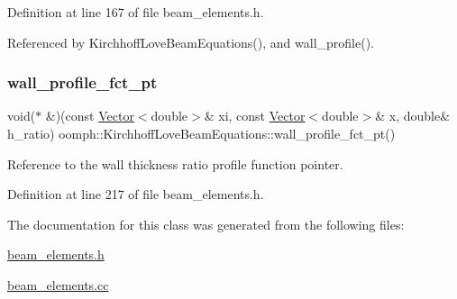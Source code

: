 Definition at line 167 of file beam\+\_\+elements.\+h.



Referenced by Kirchhoff\+Love\+Beam\+Equations(), and wall\+\_\+profile().

\mbox{\label{classoomph_1_1KirchhoffLoveBeamEquations_a692f4e893d75223ca5bedbb4ab5a1572}} 
\subsubsection{\texorpdfstring{wall\+\_\+profile\+\_\+fct\+\_\+pt}{wall\_profile\_fct\_pt}}
{\footnotesize\ttfamily void($\ast$ \&)(const \hyperlink{classoomph_1_1Vector}{Vector}$<$double$>$\& xi, const \hyperlink{classoomph_1_1Vector}{Vector}$<$double$>$\& x, double\& h\+\_\+ratio) oomph\+::\+Kirchhoff\+Love\+Beam\+Equations\+::wall\+\_\+profile\+\_\+fct\+\_\+pt()\hspace{0.3cm}{\ttfamily [inline]}}



Reference to the wall thickness ratio profile function pointer. 



Definition at line 217 of file beam\+\_\+elements.\+h.



The documentation for this class was generated from the following files\+:\begin{DoxyCompactItemize}
\item 
\hyperlink{beam__elements_8h}{beam\+\_\+elements.\+h}\item 
\hyperlink{beam__elements_8cc}{beam\+\_\+elements.\+cc}\end{DoxyCompactItemize}
